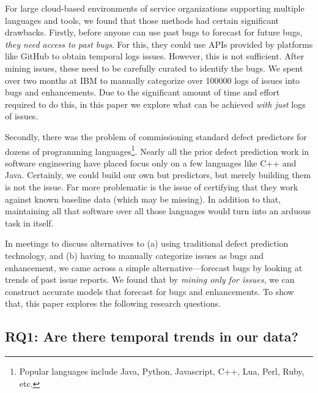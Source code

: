 \documentclass[sigconf, preprint]{acmart}
\begin{document}
For large cloud-based environments of service 
organizations supporting multiple languages and tools, we found that those 
methods had certain significant drawbacks.
Firstly, before anyone can use past bugs to forecast for future bugs,
{\em they need access to past bugs}.  For this, they could use APIs provided by 
platforms like GitHub to obtain temporal logs issues. However, this is not 
sufficient. After mining issues, these need to be carefully curated to identify 
the bugs. We spent over two months at IBM to manually categorize over 
100000 logs of issues into bugs and enhancements. Due to the significant 
amount of time and effort required to do this, in this paper we explore what 
can be achieved {\em with just} logs of issues.

Secondly, there was the problem of commissioning standard defect predictors for 
dozens of programming languages\footnote{Popular languages include Java, 
Python, 
Javascript, C++, Lua, Perl, Ruby, etc.}. Nearly all 
the prior defect prediction work in software engineering have placed focus only 
on a few languages like C++ and Java. Certainly, we could 
build our own but predictors, but merely building them is not the issue. Far more problematic 
is the issue of certifying that they work against known baseline data (which 
may be missing). In addition to that, maintaining all that software over all 
those languages would turn into an arduous task in itself.


In meetings to discuss alternatives to (a) using traditional defect prediction 
technology, and (b) having to manually categorize issues as bugs and 
enhancement, we came 
across a simple 
alternative---forecast bugs by looking 
at trends of past issue reports. We found that by \textit{mining only for 
issues}, we can construct accurate models that forecast for bugs and 
enhancements. To show that, this paper explores the following research 
questions.

\subsection*{RQ1: Are there temporal trends in our data?}
\end{document}
